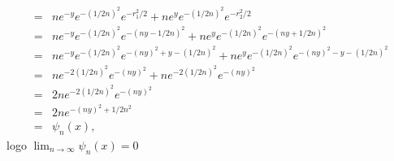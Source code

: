 \documentclass{article}
\begin{document}
\begin{enumerate}
\begin{enumerate}
$$\begin{aligned}
					\\
					= & ne^{-y}e^{- (1/2n)^{2}} e^{-r_{1}^{2}/2}+ ne^{y}e^{ - (1/2n)^{2}} e^{-r_{2}^{2}/2}
					\\
					= & ne^{-y}e^{- (1/2n)^{2}} e^{-(ny-1/2n)^{2}}+ ne^{y}e^{ - (1/2n)^{2}} e^{-(ny+1/2n)^{2}}
					\\
					= & ne^{-y}e^{- (1/2n)^{2}} e^{-(ny)^{2}+y - (1/2n)^{2}}+ ne^{y}e^{ - (1/2n)^{2}}e^{-(ny)^{2}-y - (1/2n)^{2}}
					\\
					= & ne^{- 2(1/2n)^{2}} e^{-(ny)^{2}}+ ne^{ -2 (1/2n)^{2}}e^{-(ny)^{2}}
					\\
					= & 2ne^{- 2(1/2n)^{2}} e^{-(ny)^{2}}
					\\
					= & 2n e^{-(ny)^{2}+  1/2n^{2}}
					\\
					= & \psi_{n}(x),
					\end{aligned}
					$$
					logo $\lim_{n \to \infty} \psi_{n}(x) = 0$
			\end{enumerate}
	\end{enumerate}
	
	
\end{document}
